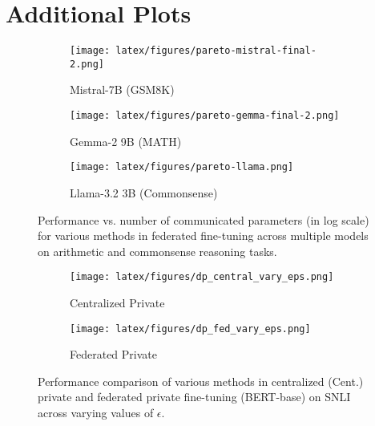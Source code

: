 \section{Additional Plots} \label{app:plots}
\begin{figure*}[!h]
    \centering
    \begin{subfigure}{0.49\textwidth}
        \centering
        \texttt{[image: latex/figures/pareto-mistral-final-2.png]}
        \caption{Mistral-7B (GSM8K)}
        \label{fig:fed-mistral}
    \end{subfigure}
    \begin{subfigure}{0.49\textwidth}
        \centering
        \texttt{[image: latex/figures/pareto-gemma-final-2.png]}
        \caption{Gemma-2 9B (MATH)}
        \label{fig:fed-math}
    \end{subfigure}
    \begin{subfigure}{0.49\textwidth}
        \centering
        \texttt{[image: latex/figures/pareto-llama.png]}
        \caption{Llama-3.2 3B (Commonsense)}
        \label{fig:fed-llama}
    \end{subfigure}
    \caption{Performance vs. number of communicated parameters (in log scale) for various methods in federated fine-tuning across multiple models on arithmetic and commonsense reasoning tasks.}
    \label{fig:results-it}
\end{figure*}

\begin{figure*}[!h]
    \centering
    \begin{subfigure}{0.49\textwidth}
        \centering
        \texttt{[image: latex/figures/dp\_central\_vary\_eps.png]}
        \caption{Centralized Private}
        \label{fig:dp-central-vary}
    \end{subfigure}
    \begin{subfigure}{0.49\textwidth}
        \centering
        \texttt{[image: latex/figures/dp\_fed\_vary\_eps.png]}
        \caption{Federated Private}
        \label{fig:dp-fed-vary}
    \end{subfigure}
    \caption{Performance comparison of various methods in centralized (Cent.) private and federated private fine-tuning (BERT-base) on SNLI across varying values of $\epsilon$.}
    \label{fig:plots-dp-vary}
\end{figure*}





